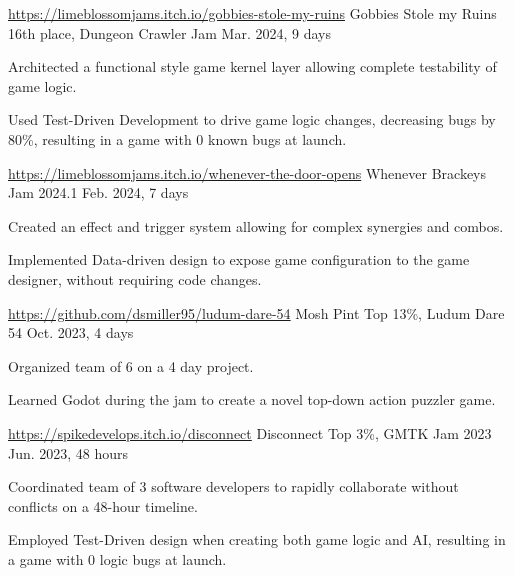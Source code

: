 \begin{cventries}
  \cventry
   {\href{https://limeblossomjams.itch.io/gobbies-stole-my-ruins}{https://limeblossomjams.itch.io/gobbies-stole-my-ruins}} %
    {Gobbies Stole my Ruins} %
    {16th place, Dungeon Crawler Jam} %
    {Mar. 2024, 9 days} %
    {
      \begin{cvitems} %
        \item {Architected a functional style game kernel layer allowing complete testability of game logic.}
        \item {Used Test-Driven Development to drive game logic changes, decreasing bugs by 80\%, resulting in a game with 0 known bugs at launch.}
      \end{cvitems}
    }

  \cventry
   {\href{https://limeblossomjams.itch.io/whenever-the-door-opens}{https://limeblossomjams.itch.io/whenever-the-door-opens}} %
    {Whenever} %
    {Brackeys Jam 2024.1} %
    {Feb. 2024, 7 days} %
    {
      \begin{cvitems} %
        \item {Created an effect and trigger system allowing for complex synergies and combos.}
        \item {Implemented Data-driven design to expose game configuration to the game designer, without requiring code changes.}
      \end{cvitems}
    }

  \cventry
   {\href{https://github.com/dsmiller95/ludum-dare-54}{https://github.com/dsmiller95/ludum-dare-54}} %
    {Mosh Pint} %
    {Top 13\%, Ludum Dare 54} %
    {Oct. 2023, 4 days} %
    {
      \begin{cvitems} %
        \item {Organized team of 6 on a 4 day project.}
        \item {Learned Godot during the jam to create a novel top-down action puzzler game.}
      \end{cvitems}
    }

  \cventry
   {\href{https://spikedevelops.itch.io/disconnect}{https://spikedevelops.itch.io/disconnect}} %
    {Disconnect} %
    {Top 3\%, GMTK Jam 2023} %
    {Jun. 2023, 48 hours} %
    {
      \begin{cvitems} %
        \item {Coordinated team of 3 software developers to rapidly collaborate without conflicts on a 48-hour timeline.}
        \item {Employed Test-Driven design when creating both game logic and AI, resulting in a game with 0 logic bugs at launch.}
      \end{cvitems}
    }


\end{cventries}
